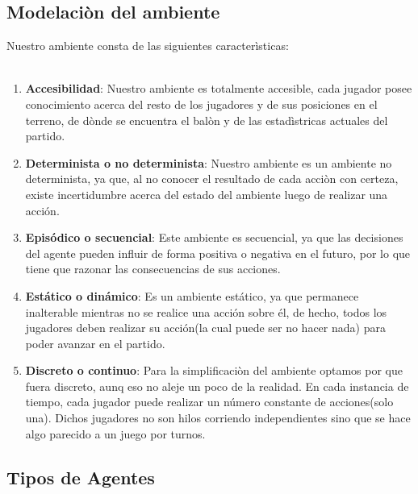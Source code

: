 \documentclass{article}
\begin{document}
\subsection{Modelaciòn del ambiente}
    Nuestro ambiente consta de las siguientes caracterìsticas:\\
    \\
    \begin{enumerate}
    \item \textbf{Accesibilidad}: Nuestro ambiente es totalmente accesible, cada jugador posee conocimiento acerca del resto de los jugadores y de sus posiciones en el terreno, de dònde se encuentra el balòn y de las estadìstricas actuales del partido.
    
    \item \textbf{Determinista o no determinista}: Nuestro ambiente es un ambiente no determinista, ya que, al no conocer el resultado de cada acciòn con certeza, existe incertidumbre acerca del estado del ambiente luego de realizar una acción.
    
    \item \textbf{Episódico o secuencial}: Este ambiente es secuencial, ya que las decisiones del agente pueden influir de forma positiva o negativa en el futuro, por lo que tiene que razonar las consecuencias de sus acciones.
    
    \item \textbf{Estático o dinámico}: Es un ambiente estático, ya que permanece inalterable mientras no se realice una acción sobre él, de hecho, todos los jugadores deben realizar su acción(la cual puede ser no hacer nada) para poder avanzar en el partido.
    
    \item \textbf{Discreto o continuo}: Para la simplificaciòn del ambiente optamos por que fuera discreto, aunq eso no aleje un poco de la realidad. En cada instancia de tiempo, cada jugador puede realizar un número constante de acciones(solo una). Dichos jugadores no son hilos corriendo independientes sino que se hace algo parecido a un juego por turnos.
\end{enumerate}

\subsection{Tipos de Agentes}
\end{document}

